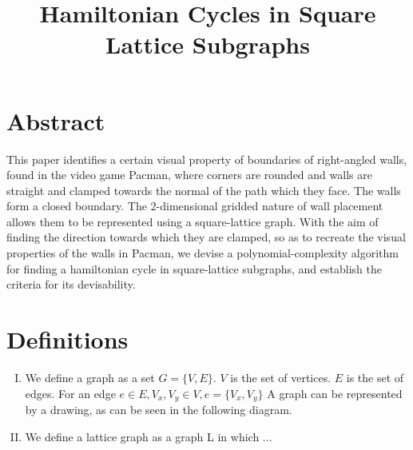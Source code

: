 \documentclass{article}
\title{Hamiltonian Cycles in Square Lattice Subgraphs}
\begin{document}
\date{\vspace{-5ex}}
\maketitle

\section{Abstract}
This paper identifies a certain visual property of boundaries of right-angled walls, found in the video game Pacman, where corners are rounded and walls are straight and clamped towards the normal of the path which they face. The walls form a closed boundary. The 2-dimensional gridded nature of wall placement allows them to be represented using a square-lattice graph. With the aim of finding the direction towards which they are clamped, so as to recreate the visual properties of the walls in Pacman, we devise a polynomial-complexity algorithm for finding a hamiltonian cycle in square-lattice subgraphs, and establish the criteria for its devisability.

\section{Definitions}
\begin{enumerate}[I.]
\item We define a graph as a set $G=\lbrace V,E \rbrace$. $V$ is the set of vertices. $E$ is the set of edges. For an edge $e\in E, V_{x},V_{y}\in V, e=\lbrace V_{x},V_{y} \rbrace $ A graph can be represented by a drawing, as can be seen in the following diagram.
\item We define a lattice graph as a graph L in which ...
\end{enumerate}
\end{document}
